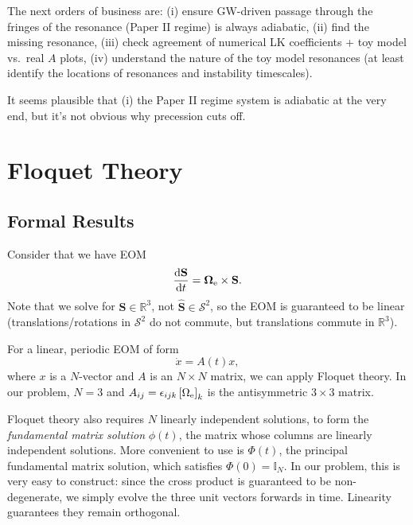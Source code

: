 \documentclass[11pt,
        usenames, %
        dvipsnames %
    ]{article}
\newcommand*{\rd}[2]{\frac{\mathrm{d}#1}{\mathrm{d}#2}}
\newcommand*{\bm}[1]{\boldsymbol{\mathbf{#1}}}
\newcommand*{\uv}[1]{\hat{\bm{#1}}}
\newcommand*{\s}[1]{\left[#1\right]}
\begin{document}
The next orders of business are: (i) ensure GW-driven passage through the
fringes of the resonance (Paper II regime) is always adiabatic, (ii) find the
missing resonance, (iii) check agreement of numerical LK coefficients + toy
model vs.\ real $A$ plots, (iv) understand the nature of the toy model
resonances (at least identify the locations of resonances and instability
timescales).

It seems plausible that (i) the Paper II regime system is adiabatic at the very
end, but it's not obvious why precession cuts off.

\section{Floquet Theory}

\subsection{Formal Results}

Consider that we have EOM
\begin{equation}
    \rd{\bm{S}}{t} = \bm{\Omega}_{\rm e} \times \bm{S}.
\end{equation}
Note that we solve for $\bm{S} \in \mathbb{R}^3$, not $\uv{S} \in
\mathcal{S}^2$, so the EOM is guaranteed to be linear (translations/rotations in
$\mathcal{S}^2$ do not commute, but translations commute in $\mathbb{R}^3$).

For a linear, periodic EOM of form
\begin{equation}
    \dot{x} = A(t)x,
\end{equation}
where $x$ is a $N$-vector and $A$ is an $N \times N$ matrix, we can apply
Floquet theory. In our problem, $N = 3$ and $A_{ij} = \epsilon_{ijk}
\s{\Omega_{\rm e}}_k$ is the antisymmetric $3 \times 3$ matrix.

Floquet theory also requires $N$ linearly independent solutions, to form the
\emph{fundamental matrix solution} $\phi(t)$, the matrix whose columns are
linearly independent solutions. More convenient to use is $\Phi(t)$, the
principal fundamental matrix solution, which satisfies $\Phi(0) = \mathbb{I}_N$.
In our problem, this is very easy to construct: since the cross product is
guaranteed to be non-degenerate, we simply evolve the three unit vectors
forwards in time. Linearity guarantees they remain orthogonal.
\end{document}

